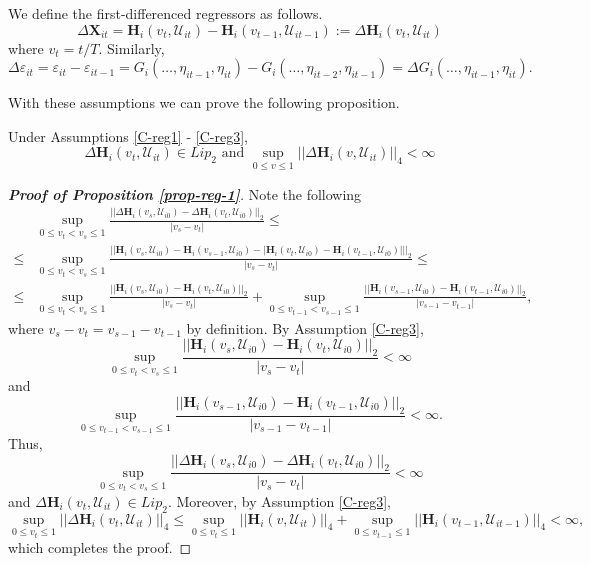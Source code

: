 We define the first-differenced regressors as follows.
\[ \Delta \mathbf{X}_{it} =\mathbf{H}_i(v_t, \mathcal{U}_{it}) - \mathbf{H}_i(v_{t-1}, \mathcal{U}_{it-1}) := \Delta \mathbf{H}_i(v_t, \mathcal{U}_{it}) \]
where $v_t = t/T$. Similarly, 
\[\Delta \varepsilon_{it} = \varepsilon_{it} - \varepsilon_{it-1} = G_i(\ldots, \eta_{it-1}, \eta_{it}) - G_i(\ldots, \eta_{it-2}, \eta_{it-1}) = \Delta G_i(\ldots, \eta_{it-1}, \eta_{it}).
\]
 
With these assumptions we can prove the following proposition.
\begin{prop}\label{prop-reg-1}
Under Assumptions \ref{C-reg1} - \ref{C-reg3},
\[ \Delta \mathbf{H}_i(v_t, \mathcal{U}_{it}) \in Lip_2 \text{ and } \sup_{0\leq v \leq 1} || \Delta \mathbf{H}_i(v, \mathcal{U}_{it})||_4 < \infty
\]
\end{prop}

\begin{proof}[\textnormal{\textbf{Proof of Proposition \ref{prop-reg-1}}}]
Note the following 
\begin{align*}
&\sup_{0\leq v_t < v_s \leq 1} \frac{||\Delta \mathbf{H}_i(v_s, \mathcal{U}_{i0}) - \Delta \mathbf{H}_i(v_t, \mathcal{U}_{i0}) ||_2}{|v_s - v_t|} \leq \\
\leq &\sup_{0\leq v_t < v_s \leq 1} \frac{||\mathbf{H}_i(v_s, \mathcal{U}_{i0}) - \mathbf{H}_i(v_{s-1}, \mathcal{U}_{i0}) - |\mathbf{H}_i(v_t, \mathcal{U}_{i0}) - \mathbf{H}_i(v_{t-1}, \mathcal{U}_{i0})| ||_2}{|v_s - v_t|} \leq\\
\leq &\sup_{0\leq v_t < v_s \leq 1} \frac{||\mathbf{H}_i(v_s, \mathcal{U}_{i0}) - \mathbf{H}_i(v_t, \mathcal{U}_{i0}) ||_2}{|v_s - v_t|} + \sup_{0\leq v_{t-1} < v_{s-1} \leq 1} \frac{||\mathbf{H}_i(v_{s-1}, \mathcal{U}_{i0}) - \mathbf{H}_i(v_{t-1}, \mathcal{U}_{i0}) ||_2}{|v_{s-1} - v_{t-1}|},
\end{align*}
where $v_s - v_t = v_{s-1} - v_{t-1}$ by definition. By Assumption \ref{C-reg3},
\[\sup_{0\leq v_t < v_s \leq 1} \frac{||\mathbf{H}_i(v_s, \mathcal{U}_{i0}) - \mathbf{H}_i(v_t, \mathcal{U}_{i0}) ||_2}{|v_s - v_t|} < \infty
\]
and 
\[\sup_{0\leq v_{t-1} < v_{s-1} \leq 1} \frac{||\mathbf{H}_i(v_{s-1}, \mathcal{U}_{i0}) - \mathbf{H}_i(v_{t-1}, \mathcal{U}_{i0}) ||_2}{|v_{s-1} - v_{t-1}|} < \infty.
\]
Thus, 
\[
\sup_{0\leq v_t < v_s \leq 1} \frac{||\Delta \mathbf{H}_i(v_s, \mathcal{U}_{i0}) - \Delta \mathbf{H}_i(v_t, \mathcal{U}_{i0}) ||_2}{|v_s - v_t|} < \infty
\]
and $\Delta \mathbf{H}_i(v_t, \mathcal{U}_{it}) \in Lip_2$. Moreover, by Assumption \ref{C-reg3},
\[
 \sup_{0\leq v_t \leq 1} || \Delta \mathbf{H}_i(v_t, \mathcal{U}_{it})||_4 \leq  \sup_{0\leq v_t \leq 1} ||\mathbf{H}_i(v, \mathcal{U}_{it})||_4 +  \sup_{0\leq v_{t-1} \leq 1} || \mathbf{H}_i(v_{t-1}, \mathcal{U}_{it-1})||_4 < \infty,
\]
which completes the proof.
\end{proof} 


